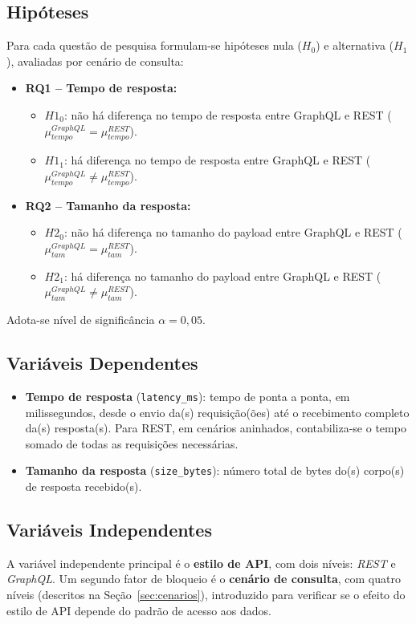 \documentclass[conference]{IEEEtran}
\begin{document}
\subsection{Hipóteses}
Para cada questão de pesquisa formulam-se hipóteses nula ($H_0$) e alternativa
($H_1$), avaliadas por cenário de consulta:
\begin{itemize}
  \item \textbf{RQ1 -- Tempo de resposta:}
  \begin{itemize}
    \item $H1_0$: não há diferença no tempo de resposta entre GraphQL e REST
    ($\mu_{tempo}^{GraphQL} = \mu_{tempo}^{REST}$).
    \item $H1_1$: há diferença no tempo de resposta entre GraphQL e REST
    ($\mu_{tempo}^{GraphQL} \neq \mu_{tempo}^{REST}$).
  \end{itemize}
  \item \textbf{RQ2 -- Tamanho da resposta:}
  \begin{itemize}
    \item $H2_0$: não há diferença no tamanho do payload entre GraphQL e REST
    ($\mu_{tam}^{GraphQL} = \mu_{tam}^{REST}$).
    \item $H2_1$: há diferença no tamanho do payload entre GraphQL e REST
    ($\mu_{tam}^{GraphQL} \neq \mu_{tam}^{REST}$).
  \end{itemize}
\end{itemize}
Adota-se nível de significância $\alpha = 0{,}05$.

\subsection{Variáveis Dependentes}
\begin{itemize}
  \item \textbf{Tempo de resposta} (\texttt{latency\_ms}): tempo de ponta a
  ponta, em milissegundos, desde o envio da(s) requisição(ões) até o
  recebimento completo da(s) resposta(s). Para REST, em cenários aninhados,
  contabiliza-se o tempo somado de todas as requisições necessárias.
  \item \textbf{Tamanho da resposta} (\texttt{size\_bytes}): número total de
  bytes do(s) corpo(s) de resposta recebido(s).
\end{itemize}

\subsection{Variáveis Independentes}
A variável independente principal é o \textbf{estilo de API}, com dois níveis:
\textit{REST} e \textit{GraphQL}. Um segundo fator de bloqueio é o
\textbf{cenário de consulta}, com quatro níveis (descritos na
Seção~\ref{sec:cenarios}), introduzido para verificar se o efeito do estilo de
API depende do padrão de acesso aos dados.
\end{document}
